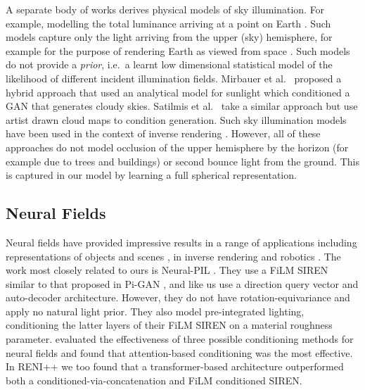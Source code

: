 A separate body of works derives physical models of sky illumination. For example, modelling the total luminance arriving at a point on Earth \cite{PEREZ1993235}. Such models capture only the light arriving from the upper (sky) hemisphere, for example for the purpose of rendering Earth as viewed from space \cite{10.1145/166117.166140}. Such models \cite{10.1145/311535.311545,10.1145/2185520.2185591} do not provide a \emph{prior}, i.e.~a learnt low dimensional statistical model of the likelihood of different incident illumination fields. Mirbauer et al.~\cite{mirbauer2024skygan} proposed a hybrid approach that used an analytical model for sunlight which conditioned a GAN that generates cloudy skies. Satilmis et al.~\cite{satilmis2022deep} take a similar approach but use artist drawn cloud maps to condition generation. Such sky illumination models have been used in the context of inverse rendering \cite{yu2021hierarchical,zhu2021spatially}. However, all of these approaches do not model occlusion of the upper hemisphere by the horizon (for example due to trees and buildings) or second bounce light from the ground. This is captured in our model by learning a full spherical representation. 

\subsection{Neural Fields}

Neural fields \cite{xie_neural_2021} have provided impressive results in a range of applications including representations of objects and scenes \cite{sitzmann_implicit_2020, atzmon_sal_2020, mescheder_occupancy_2019, chibane_neural_2020, chen_learning_2019, gropp_implicit_2020, park_deepsdf_2019, tancik_block-nerf_2022}, in inverse rendering \cite{boss_nerd_2021, bi_neural_2020, rudnev_nerf_2022, srinivasan_nerv_2020, boss_neural-pil_2021, zhang_physg_2021} and robotics \cite{li_3d_2021, chen_full-body_2021, ortiz_isdf_2022}. The work most closely related to ours is Neural-PIL \cite{boss_neural-pil_2021}. They use a FiLM SIREN similar to that proposed in Pi-GAN \cite{chan_pi-gan_2021}, and like us use a direction query vector and auto-decoder architecture. However, they do not have rotation-equivariance and apply no natural light prior. They also model pre-integrated lighting, conditioning the latter layers of their FiLM SIREN on a material roughness parameter. \cite{rebainAttentionBeatsConcatenation2023} evaluated the effectiveness of three possible conditioning methods for neural fields and found that attention-based conditioning was the most effective. In RENI++ we too found that a transformer-based architecture outperformed both a conditioned-via-concatenation and FiLM conditioned SIREN.

